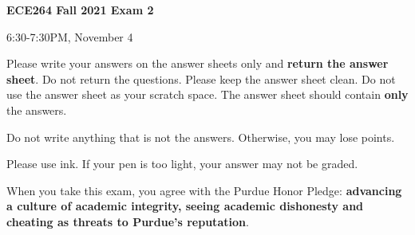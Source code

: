 
\newif\ifexam
\examtrue
\examfalse






\begin{center}
\begin{huge}
{\bf
ECE264 Fall 2021
Exam 2\vspace{0.4in}

6:30-7:30PM, November 4
}

\vspace{1in}
\end{huge}

\begin{LARGE}
Please write your answers on the answer sheets only and {\bf return
the answer sheet}. Do not return the questions.  Please keep the
answer sheet clean. Do not use the answer sheet as your scratch space.
The answer sheet should contain {\bf only} the answers.
\vspace{1in}

Do not write
anything that is not the answers.  Otherwise, you may lose points.

\vspace{0.5in}

Please use  ink. If your pen is too light,
your answer may not be graded.

\end{LARGE}
\vspace{0.5in}

\begin{large}
When you take this exam, you agree with the Purdue Honor Pledge: {\bf
advancing a culture of academic integrity, seeing academic dishonesty
and cheating as threats to Purdue’s reputation}.
\end{large}

\end{center}

\clearpage

